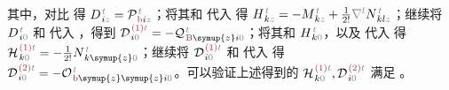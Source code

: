 其中，对比  得 $D^{\;\!\mathcolor{gray}{t}}_{\;\! i\mathcolor{gray}{z}} = {\mathcal{P}}^{\;\!\mathcolor{gray}{t}}_{\;\!\textcolor{Maroon}{\text{b}} i \mathcolor{gray}{z}}$；将其和  代入  得 $H^{\;\!\mathcolor{gray}{t}}_{\;\! k\mathcolor{gray}{z}} = - M^{\;\!\mathcolor{gray}{t}}_{\;\! k \mathcolor{gray}{z}} + \frac{1}{2!} \mathcolor{gray}{\nabla^l} N^{\;\!\mathcolor{gray}{t}}_{\;\! kl\mathcolor{gray}{z}}$；继续将 $D^{\;\!\mathcolor{gray}{t}}_{\;\! i\mathcolor{gray}{0}}$ 和  代入 ，得到 ${\mathcal{D}}^{\;\!\textcolor{Maroon}{(1)}\mathcolor{gray}{t}}_{\;\! i\mathcolor{gray}{0}} = - {\mathcal{Q}}^{\;\!\mathcolor{gray}{t}}_{\;\!\textcolor{Maroon}{\text{B}} \symup{z}i \mathcolor{gray}{0}}$；将其和 $H^{\;\!\mathcolor{gray}{t}}_{\;\! k\mathcolor{gray}{0}}$，以及  代入  得 ${\mathcal{H}}^{\;\!\textcolor{Maroon}{(1)}\mathcolor{gray}{t}}_{\;\! k\mathcolor{gray}{0}} = - \frac{1}{2!} N^{\;\!\mathcolor{gray}{t}}_{\;\! k\symup{z}\mathcolor{gray}{0}}$；继续将 ${\mathcal{D}}^{\;\!\textcolor{Maroon}{(1)}\mathcolor{gray}{t}}_{\;\! i\mathcolor{gray}{0}}$ 和  代入  得 ${\mathcal{D}}^{\;\!\textcolor{Maroon}{(2)}\mathcolor{gray}{t}}_{\;\! i\mathcolor{gray}{0}} = - {\mathcal{O}}^{\;\!\mathcolor{gray}{t}}_{\;\!\textcolor{Maroon}{\text{b}} \symup{z}\symup{z}i \mathcolor{gray}{0}}$。可以验证上述得到的 ${\mathcal{H}}^{\;\!\textcolor{Maroon}{(1)}\mathcolor{gray}{t}}_{\;\! k\mathcolor{gray}{0}}, {\mathcal{D}}^{\;\!\textcolor{Maroon}{(2)}\mathcolor{gray}{t}}_{\;\! i\mathcolor{gray}{0}}$ 满足 。

